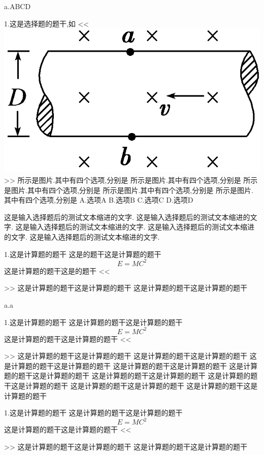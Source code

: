 \documentclass[a4paper,fontset = windowsnew]{ctexbook}
\begin{document}
\begin{choices}
  a.ABCD

  1.这是选择题的题干,如
  <<
  \includegraphics{1.png}
  >>
  所示是图片.其中有四个选项,分别是
  所示是图片.其中有四个选项,分别是
  所示是图片.其中有四个选项,分别是
  所示是图片.其中有四个选项,分别是
  所示是图片.其中有四个选项,分别是
  A.选项A
  B.选项B
  C.选项C
  D.选项D

\end{choices}

这是输入选择题后的测试文本缩进的文字.
这是输入选择题后的测试文本缩进的文字.
这是输入选择题后的测试文本缩进的文字.
这是输入选择题后的测试文本缩进的文字.
这是输入选择题后的测试文本缩进的文字.
\newpage
\begin{blanks}
1.这是计算题的题干
这是的题干这是计算题的题干
\begin{equation}
  E=MC^2
\end{equation}
这是计算题的题干这是的题干
<<
>>
这是计算题的题干这是计算题的题干
这是计算题的题干这是计算题的题干

a.a

1.这是计算题的题干
这是计算题的题干这是计算题的题干
\begin{equation}
  E=MC^2
\end{equation}
这是计算题的题干这是计算题的题干
<<
>>
这是计算题的题干这是计算题的题干
这是计算题的题干这是计算题的题干
这是计算题的题干这是计算题的题干
这是计算题的题干这是计算题的题干
这是计算题的题干这是计算题的题干
这是计算题的题干这是计算题的题干
这是计算题的题干这是计算题的题干
这是计算题的题干这是计算题的题干
这是计算题的题干这是计算题的题干
  
1.这是计算题的题干
这是计算题的题干这是计算题的题干
\begin{equation}
  E=MC^2
\end{equation}
这是计算题的题干这是计算题的题干
<<
>>
这是计算题的题干这是计算题的题干
这是计算题的题干这是计算题的题干

\end{blanks}
\end{document}
